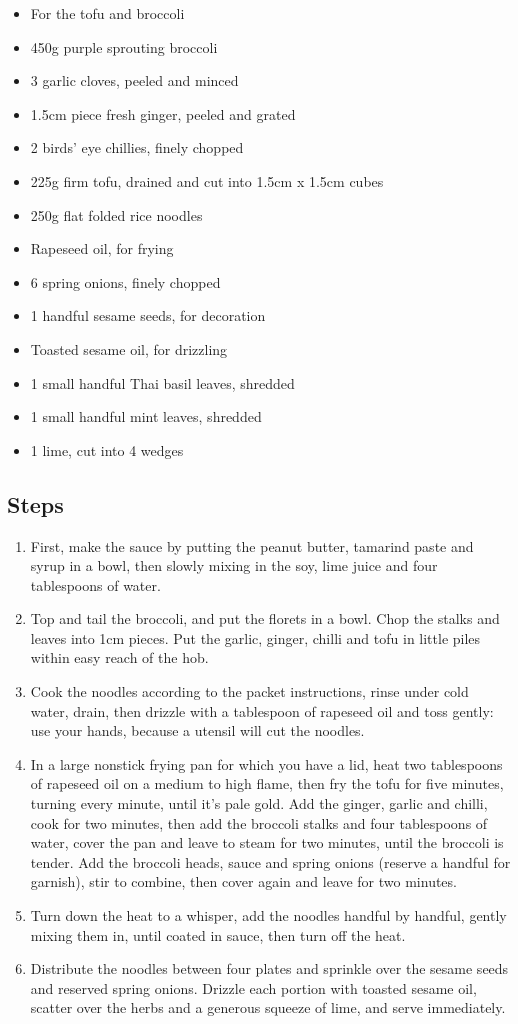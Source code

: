 \documentclass{book}
\begin{document}
\begin{itemize}
\item For the tofu and broccoli
\item 450g purple sprouting broccoli
\item 3 garlic cloves, peeled and minced
\item 1.5cm piece fresh ginger, peeled and grated
\item 2 birds’ eye chillies, finely chopped
\item 225g firm tofu, drained and cut into 1.5cm x 1.5cm cubes
\item 250g flat folded rice noodles
\item Rapeseed oil, for frying
\item 6 spring onions, finely chopped
\item 1 handful sesame seeds, for decoration
\item Toasted sesame oil, for drizzling
\item 1 small handful Thai basil leaves, shredded
\item 1 small handful mint leaves, shredded
\item 1 lime, cut into 4 wedges
\end{itemize}

\subsection*{Steps}
\begin{enumerate}
\item First, make the sauce by putting the peanut butter, tamarind paste and syrup in a bowl, then slowly mixing in the soy, lime juice and four tablespoons of water.
\item Top and tail the broccoli, and put the florets in a bowl. Chop the stalks and leaves into 1cm pieces. Put the garlic, ginger, chilli and tofu in little piles within easy reach of the hob.
\item Cook the noodles according to the packet instructions, rinse under cold water, drain, then drizzle with a tablespoon of rapeseed oil and toss gently: use your hands, because a utensil will cut the noodles.
\item In a large nonstick frying pan for which you have a lid, heat two tablespoons of rapeseed oil on a medium to high flame, then fry the tofu for five minutes, turning every minute, until it’s pale gold. Add the ginger, garlic and chilli, cook for two minutes, then add the broccoli stalks and four tablespoons of water, cover the pan and leave to steam for two minutes, until the broccoli is tender. Add the broccoli heads, sauce and spring onions (reserve a handful for garnish), stir to combine, then cover again and leave for two minutes.
\item Turn down the heat to a whisper, add the noodles handful by handful, gently mixing them in, until coated in sauce, then turn off the heat.
\item Distribute the noodles between four plates and sprinkle over the sesame seeds and reserved spring onions. Drizzle each portion with toasted sesame oil, scatter over the herbs and a generous squeeze of lime, and serve immediately.
\end{enumerate}
\newpage
\end{document}
